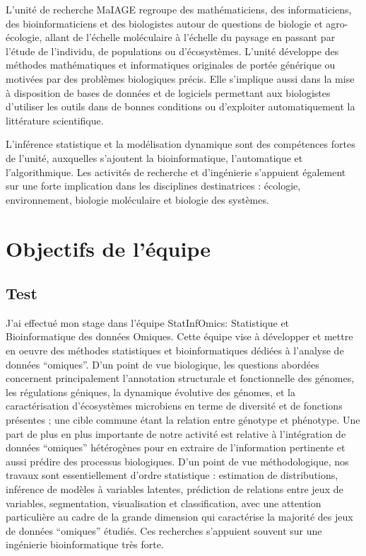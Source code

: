 \documentclass[12pt,a4paper]{article} %
\begin{document}
L'unité de recherche MaIAGE regroupe des mathématiciens, des informaticiens, des bioinformaticiens et des biologistes autour de questions de biologie et agro-écologie, allant de l'échelle moléculaire à l'échelle du paysage en passant par l'étude de l'individu, de populations ou d'écosystèmes.
L'unité développe des méthodes mathématiques et informatiques originales de portée générique ou motivées par des problèmes biologiques précis. Elle s'implique aussi dans la mise à disposition de bases de données et de logiciels permettant aux biologistes d'utiliser les outils dans de bonnes conditions ou d'exploiter automatiquement la littérature scientifique.

L'inférence statistique et la modélisation dynamique sont des compétences fortes de l'unité, auxquelles s'ajoutent la bioinformatique, l'automatique et l'algorithmique. Les activités de recherche et d'ingénierie s'appuient également sur une forte implication dans les disciplines destinatrices : écologie, environnement, biologie moléculaire et biologie des systèmes.
\newpage
\section{Objectifs de l'équipe} \subsection{Test}
J'ai effectué mon stage dans l'équipe StatInfOmics: Statistique et Bioinformatique des données Omiques.
Cette équipe vise à développer et mettre en oeuvre des méthodes statistiques et bioinformatiques dédiées à l’analyse de données “omiques”. D’un point de vue biologique, les questions abordées concernent principalement l’annotation structurale et fonctionnelle des génomes, les régulations géniques, la dynamique évolutive des génomes, et la caractérisation d’écosystèmes microbiens en terme de diversité et de fonctions présentes ; une cible commune étant la relation entre génotype et phénotype. Une part de plus en plus importante de notre activité est relative à l’intégration de données “omiques” hétérogènes pour en extraire de l’information pertinente et aussi prédire des processus biologiques. D’un point de vue méthodologique, nos travaux sont essentiellement d’ordre statistique : estimation de distributions, inférence de modèles à variables latentes, prédiction de relations entre jeux de variables, segmentation, visualisation et classification, avec une attention particulière au cadre de la grande dimension qui caractérise la majorité des jeux de données “omiques” étudiés. Ces recherches s’appuient souvent sur une ingénierie bioinformatique très forte.
\newpage
\end{document}
